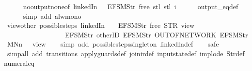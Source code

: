 \begin{isabellebody}
\ \ \ \ \isamarkupfalse%
\ no{\isacharunderscore}output{\isacharunderscore}none{\isacharbrackleft}of\ linkedIn\ {\isachardoublequoteopen}{\isacharparenleft}{\isacharless}{\isachargreater}{\isacharparenleft}{}\ {\isacharcolon}{\isacharequal}\ EFSM{\isachardot}Str\ {\isacharprime}{\isacharprime}free{\isacharprime}{\isacharprime}{\isacharparenright}{\isacharparenright}{\isachardoublequoteclose}\ {\isachardoublequoteopen}stl\ {\isacharparenleft}stl\ i{\isacharparenright}{\isachardoublequoteclose}{\isacharbrackright}\isanewline
\ \ \ \ \isamarkupfalse%
\ output_eq{\isacharunderscore}def\isanewline
\ \ \ \ \isamarkupfalse%
\ {\isacharparenleft}simp\ add{\isacharcolon}\ alw{\isacharunderscore}mono{\isacharparenright}\isanewline
\ \ \isamarkupfalse%
\isanewline
{}\isamarkupfalse%
%
\endisatagproof
{\isafoldproof}%
%
\isadelimproof
\isanewline
%
\endisadelimproof
\isanewline
{}\isamarkupfalse%
\ view{\isacharunderscore}other{\isacharcolon}\ {\isachardoublequoteopen}possible{\isacharunderscore}steps\ linkedIn\ {}\ {\isacharparenleft}{\isacharless}{\isachargreater}{\isacharparenleft}{}\ {\isacharcolon}{\isacharequal}\ EFSM{\isachardot}Str\ {\isacharprime}{\isacharprime}free{\isacharprime}{\isacharprime}{\isacharparenright}{\isacharparenright}\ STR\ {\isacharprime}{\isacharprime}view{\isacharprime}{\isacharprime}\isanewline
\ \ \ \ \ \ \ \ \ \ \ \ \ \ \ \ \ \ {\isacharbrackleft}EFSM{\isachardot}Str\ {\isacharprime}{\isacharprime}otherID{\isacharprime}{\isacharprime}{\isacharcomma}\ EFSM{\isachardot}Str\ {\isacharprime}{\isacharprime}OUT{\isacharunderscore}OF{\isacharunderscore}NETWORK{\isacharprime}{\isacharprime}{\isacharcomma}\ EFSM{\isachardot}Str\ {\isacharprime}{\isacharprime}MNn{}{\isacharprime}{\isacharprime}{\isacharbrackright}\ {\isacharequal}\ {\isacharbraceleft}{\isacharbar}{\isacharparenleft}{}{\isacharcomma}\ view{}{\isacharparenright}{\isacharbar}{\isacharbraceright}{\isachardoublequoteclose}\isanewline
%
\isadelimproof
\ \ %
\endisadelimproof
%
\isatagproof
{}\isamarkupfalse%
\ {\isacharparenleft}simp\ add{\isacharcolon}\ possible{\isacharunderscore}steps{\isacharunderscore}singleton\ linkedIn{\isacharunderscore}def{\isacharparenright}\isanewline
\ \ \isamarkupfalse%
\ safe\isanewline
\ \ \isamarkupfalse%
\ {\isacharparenleft}simp{\isacharunderscore}all\ add{\isacharcolon}\ transitions\ apply{\isacharunderscore}guards{\isacharunderscore}def\ join{\isacharunderscore}ir{\isacharunderscore}def\ input{}state{\isacharunderscore}def\ implode\ Str{\isacharunderscore}def\ numeral{\isacharunderscore}{}{\isacharunderscore}eq{\isacharunderscore}{}{\isacharparenright}%

\end{isabellebody}
